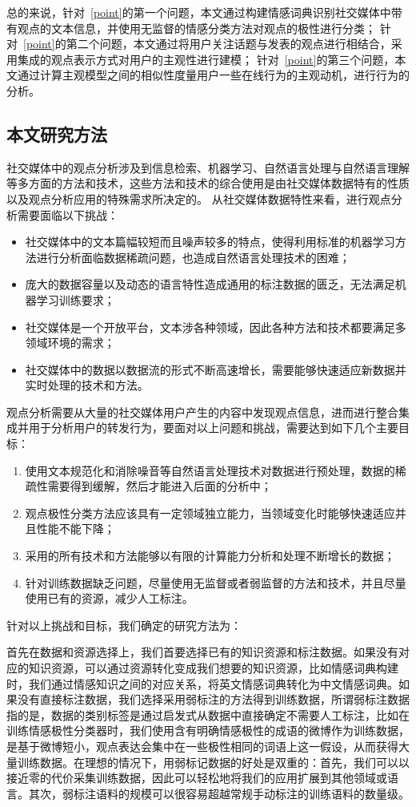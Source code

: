 总的来说，针对~\ref{point}的第一个问题，本文通过构建情感词典识别社交媒体中带有观点的文本信息，并使用无监督的情感分类方法对观点的极性进行分类；
针对~\ref{point}的第二个问题，本文通过将用户关注话题与发表的观点进行相结合，采用集成的观点表示方式对用户的主观性进行建模；
针对~\ref{point}的第三个问题，本文通过计算主观模型之间的相似性度量用户一些在线行为的主观动机，进行行为的分析。

\subsection{本文研究方法}
社交媒体中的观点分析涉及到信息检索、机器学习、自然语言处理与自然语言理解等多方面的方法和技术，这些方法和技术的综合使用是由社交媒体数据特有的性质以及观点分析应用的特殊需求所决定的。
从社交媒体数据特性来看，进行观点分析需要面临以下挑战：
\begin{itemize}
\item 社交媒体中的文本篇幅较短而且噪声较多的特点，使得利用标准的机器学习方法进行分析面临数据稀疏问题，也造成自然语言处理技术的困难；
\item 庞大的数据容量以及动态的语言特性造成通用的标注数据的匮乏，无法满足机器学习训练要求；
\item 社交媒体是一个开放平台，文本涉各种领域，因此各种方法和技术都要满足多领域环境的需求；
\item 社交媒体中的数据以数据流的形式不断高速增长，需要能够快速适应新数据并实时处理的技术和方法。
\end{itemize}

观点分析需要从大量的社交媒体用户产生的内容中发现观点信息，进而进行整合集成并用于分析用户的转发行为，要面对以上问题和挑战，需要达到如下几个主要目标：
\begin{enumerate}
\item 使用文本规范化和消除噪音等自然语言处理技术对数据进行预处理，数据的稀疏性需要得到缓解，然后才能进入后面的分析中；
\item 观点极性分类方法应该具有一定领域独立能力，当领域变化时能够快速适应并且性能不能下降；
\item 采用的所有技术和方法能够以有限的计算能力分析和处理不断增长的数据；
\item 针对训练数据缺乏问题，尽量使用无监督或者弱监督的方法和技术，并且尽量使用已有的资源，减少人工标注。
\end{enumerate}  

针对以上挑战和目标，我们确定的研究方法为：

首先在数据和资源选择上，我们首要选择已有的知识资源和标注数据。如果没有对应的知识资源，可以通过资源转化变成我们想要的知识资源，比如情感词典构建时，我们通过情感知识之间的对应关系，将英文情感词典转化为中文情感词典。如果没有直接标注数据，我们选择采用弱标注的方法得到训练数据，所谓弱标注数据指的是，数据的类别标签是通过启发式从数据中直接确定不需要人工标注，比如在训练情感极性分类器时，我们使用含有明确情感极性的成语的微博作为训练数据，是基于微博短小，观点表达会集中在一些极性相同的词语上这一假设，从而获得大量训练数据。在理想的情况下，用弱标记数据的好处是双重的：首先，我们可以以接近零的代价采集训练数据，因此可以轻松地将我们的应用扩展到其他领域或语言。其次，弱标注语料的规模可以很容易超越常规手动标注的训练语料的数量级。

